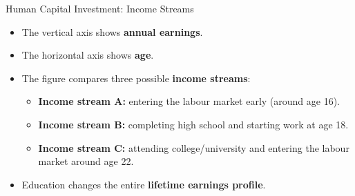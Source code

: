 \documentclass[aspectratio=169]{beamer}
\begin{document}
\begin{frame}{Human Capital Investment: Income Streams}


\begin{itemize}

\item The vertical axis shows \textbf{annual earnings}.

\item The horizontal axis shows \textbf{age}.

\item The figure compares three possible \textbf{income streams}:
\begin{itemize}

\item \textbf{Income stream A:} entering the labour market early (around age 16).

\item \textbf{Income stream B:} completing high school and starting work at age 18.

\item \textbf{Income stream C:} attending college/university and entering the labour market around age 22.

\end{itemize}

\item Education changes the entire \textbf{lifetime earnings profile}.

\end{itemize}

\end{frame}
\end{document}
